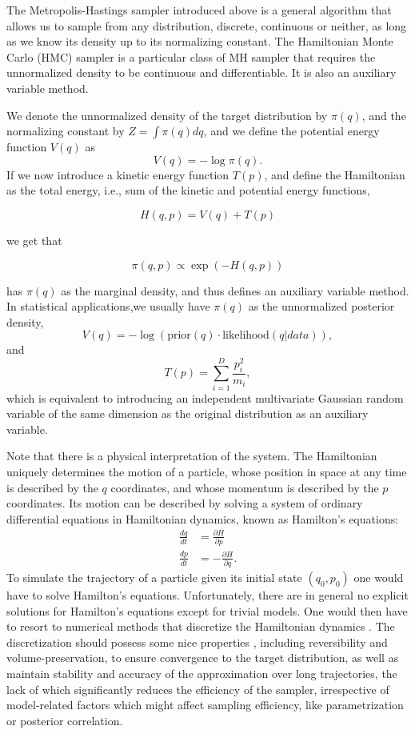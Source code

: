 \documentclass[12pt]{report}
\begin{document}
The Metropolis-Hastings sampler introduced above is a general algorithm that allows us to sample from any distribution, discrete, continuous or neither, as long as we know its density up to its normalizing constant. The Hamiltonian Monte Carlo (HMC) sampler is a particular class of MH sampler that requires the unnormalized density to be continuous and differentiable. It is also an auxiliary variable method. 


We denote the unnormalized density of the target distribution by $\pi(q)$, and the normalizing constant by $Z = \int\pi(q)dq $, and we define the potential energy function $V(q)$ as 
\[ V(q) =  -\log \pi(q) .\]
If we now introduce a kinetic energy function $T(p)$, and define
the Hamiltonian as the total energy, i.e., sum of the kinetic and potential energy functions, 

\[ H(q,p) = V(q) + T(p) \]

we get that 

\[\pi(q,p) \propto  \exp(-H(q,p)) \]

has $\pi(q)$ as the marginal density, and thus defines an auxiliary variable method. In statistical applications,we usually have $\pi(q)$ as the unnormalized posterior
density, 
\[V(q) = -\log(\text{prior}(q) \cdot \text{likelihood}(q|data) ), \]
and 
\[T(p) = \sum_{i=1}^D \frac{p_i^2}{m_i}, \]
which is equivalent to introducing an independent multivariate Gaussian random variable of
the same dimension as the original distribution as an auxiliary variable. 

Note that there is a physical interpretation of the system. The Hamiltonian uniquely determines the motion of a particle, whose position in space at any time is described by the $q$ coordinates, and whose momentum is described by the $p$ coordinates. Its motion can be described by solving a system of ordinary differential equations in Hamiltonian dynamics, known as Hamilton's equations:
\begin{align*}
    \frac{dq}{dt} &= \frac{\partial H}{\partial p } \\
    \frac{dp}{dt} &= -\frac{\partial H}{\partial q}.
\end{align*}
To simulate the trajectory of a particle given its initial state $(q_0,p_0)$ one
would have to solve Hamilton's equations. Unfortunately, there are in general no
explicit solutions for Hamilton's equations except for trivial models. One would
then have to resort to numerical methods that discretize the Hamiltonian
dynamics \cite{leimkuhler2004simulating}. The discretization should
possess some nice properties , including reversibility and volume-preservation, to ensure convergence to the target distribution, as well as  maintain 
stability and accuracy of the approximation over long trajectories, the lack of which significantly reduces the efficiency of the sampler, irrespective of model-related factors which might affect sampling efficiency, like parametrization or posterior correlation.  
\end{document}
